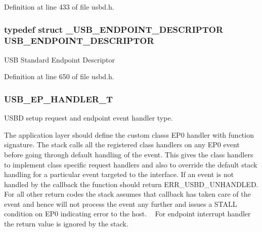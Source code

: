 Definition at line 433 of file usbd.\+h.

\subsubsection[{\texorpdfstring{U\+S\+B\+\_\+\+E\+N\+D\+P\+O\+I\+N\+T\+\_\+\+D\+E\+S\+C\+R\+I\+P\+T\+OR}{USB_ENDPOINT_DESCRIPTOR}}]{\setlength{\rightskip}{0pt plus 5cm}typedef struct {\bf \+\_\+\+U\+S\+B\+\_\+\+E\+N\+D\+P\+O\+I\+N\+T\+\_\+\+D\+E\+S\+C\+R\+I\+P\+T\+OR} {\bf U\+S\+B\+\_\+\+E\+N\+D\+P\+O\+I\+N\+T\+\_\+\+D\+E\+S\+C\+R\+I\+P\+T\+OR}}\hypertarget{group__USBD__Core_ga652b2871268bd903653cbff0f3448a6e}{}\label{group__USBD__Core_ga652b2871268bd903653cbff0f3448a6e}
U\+SB Standard Endpoint Descriptor 

Definition at line 650 of file usbd.\+h.

\subsubsection[{\texorpdfstring{U\+S\+B\+\_\+\+E\+P\+\_\+\+H\+A\+N\+D\+L\+E\+R\+\_\+T}{USB_EP_HANDLER_T}}]{\setlength{\rightskip}{0pt plus 5cm}U\+S\+B\+\_\+\+E\+P\+\_\+\+H\+A\+N\+D\+L\+E\+R\+\_\+T}\hypertarget{group__USBD__Core_gaa578d29a85226108ef62c6d5c325b742}{}\label{group__USBD__Core_gaa578d29a85226108ef62c6d5c325b742}


U\+S\+BD setup request and endpoint event handler type. 

The application layer should define the custom class\textquotesingle{}s E\+P0 handler with function signature. The stack calls all the registered class handlers on any E\+P0 event before going through default handling of the event. This gives the class handlers to implement class specific request handlers and also to override the default stack handling for a particular event targeted to the interface. If an event is not handled by the callback the function should return E\+R\+R\+\_\+\+U\+S\+B\+D\+\_\+\+U\+N\+H\+A\+N\+D\+L\+ED. For all other return codes the stack assumes that callback has taken care of the event and hence will not process the event any further and issues a S\+T\+A\+LL condition on E\+P0 indicating error to the host. ~\newline
For endpoint interrupt handler the return value is ignored by the stack. ~\newline


